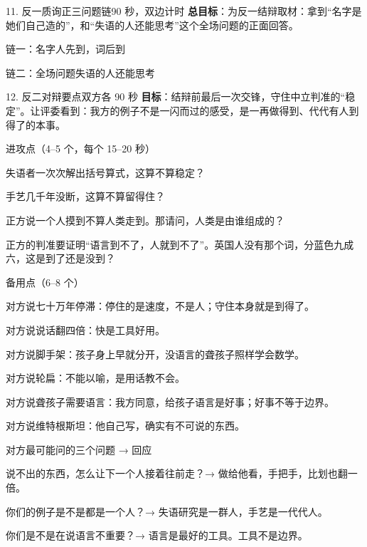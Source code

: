 \documentclass[script,con]{debate}
\begin{document}
\begin{stage}{11. 反一质询正三问题链}{90 秒，双边计时}
\textbf{总目标}：为反一结辩取材：拿到“名字是她们自己造的”，和“失语的人还能思考”这个全场问题的正面回答。
\begin{chain}{链一：名字}{人先到，词后到}
\end{chain}
\begin{chain}{链二：全场问题}{失语的人还能思考}
\end{chain}
\end{stage}

\begin{stage}{12. 反二对辩要点}{双方各 90 秒}
\textbf{目标}：结辩前最后一次交锋，守住中立判准的“稳定”。让评委看到：我方的例子不是一闪而过的感受，是一再做得到、代代有人到得了的本事。
\begin{points}{进攻点（4–5 个，每个 15–20 秒）}
\item 失语者一次次解出括号算式，这算不算稳定？
\item 手艺几千年没断，这算不算留得住？
\item 正方说一个人摸到不算人类走到。那请问，人类是由谁组成的？
\item 正方的判准要证明“语言到不了，人就到不了”。英国人没有那个词，分蓝色九成六，这是到了还是没到？
\end{points}
\begin{points}{备用点（6–8 个）}
\item 对方说七十万年停滞：停住的是速度，不是人；守住本身就是到得了。
\item 对方说说话翻四倍：快是工具好用。
\item 对方说脚手架：孩子身上早就分开，没语言的聋孩子照样学会数学。
\item 对方说轮扁：不能以喻，是用话教不会。
\item 对方说聋孩子需要语言：我方同意，给孩子语言是好事；好事不等于边界。
\item 对方说维特根斯坦：他自己写，确实有不可说的东西。
\end{points}
\begin{points}{对方最可能问的三个问题 → 回应}
\item 说不出的东西，怎么让下一个人接着往前走？→ 做给他看，手把手，比划也翻一倍。
\item 你们的例子是不是都是一个人？→ 失语研究是一群人，手艺是一代代人。
\item 你们是不是在说语言不重要？→ 语言是最好的工具。工具不是边界。
\end{points}
\end{stage}
\end{document}
